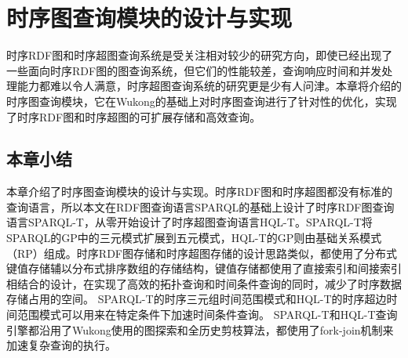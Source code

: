 \chapter{时序图查询模块的设计与实现}
时序RDF图和时序超图查询系统是受关注相对较少的研究方向，即使已经出现了一些面向时序RDF图的图查询系统，但它们的性能较差，查询响应时间和并发处理能力都难以令人满意，时序超图查询系统的研究更是少有人问津。本章将介绍\sys 的时序图查询模块，它在Wukong的基础上对时序图查询进行了针对性的优化，实现了时序RDF图和时序超图的可扩展存储和高效查询。





\section{本章小结}
本章介绍了\sys 时序图查询模块的设计与实现。时序RDF图和时序超图都没有标准的查询语言，所以本文在RDF图查询语言SPARQL的基础上设计了时序RDF图查询语言SPARQL-T，从零开始设计了时序超图查询语言HQL-T。SPARQL-T将SPARQL的GP中的三元模式扩展到五元模式，HQL-T的GP则由基础关系模式（RP）组成。时序RDF图存储和时序超图存储的设计思路类似，都使用了分布式键值存储辅以分布式排序数组的存储结构，键值存储都使用了直接索引和间接索引相结合的设计，在实现了高效的拓扑查询和时间条件查询的同时，减少了时序数据存储占用的空间。
SPARQL-T的时序三元组时间范围模式和HQL-T的时序超边时间范围模式可以用来在特定条件下加速时间条件查询。
SPARQL-T和HQL-T查询引擎都沿用了Wukong使用的图探索和全历史剪枝算法，都使用了fork-join机制来加速复杂查询的执行。

